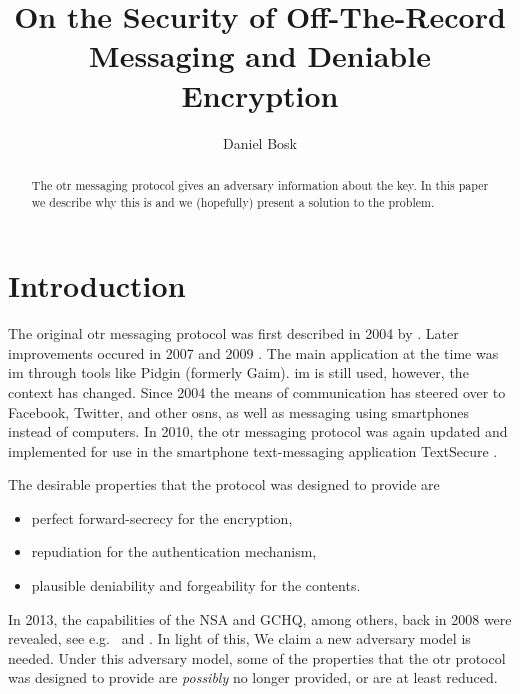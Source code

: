 \title{%
  On the Security of Off-The-Record Messaging
  and Deniable Encryption
}
\author{%
  Daniel Bosk
}

\maketitle
\begin{abstract}
  The \ac{otr} messaging protocol gives an adversary information about the key.
  In this paper we describe why this is and we (hopefully) present a solution 
  to the problem.
\end{abstract}


\acresetall
\section{Introduction}

The original \ac{otr} messaging protocol was first described in 2004 by 
\citeauthor{otr2004} \cite{otr2004}.
Later improvements occured in 2007 \cite{otr2007} and 2009 \cite{multiotr2009}.
The main application at the time was \ac{im} through tools like Pidgin 
\cite{pidgin} (formerly Gaim).
\ac{im} is still used, however, the context has changed.
Since 2004 the means of communication has steered over to Facebook, Twitter, 
and other \acp{osn}, as well as messaging using smartphones instead of 
computers.
In 2010, the \ac{otr} messaging protocol was again updated and implemented for
use in the smartphone text-messaging application TextSecure \cite{textsecure}.

The desirable properties that the protocol was designed to provide are
\begin{itemize}
  \item perfect forward-secrecy for the encryption,
  \item repudiation for the authentication mechanism,
  \item plausible deniability and forgeability for the contents.
\end{itemize}
In 2013, the capabilities of the NSA and GCHQ, among others, back in 2008 were 
revealed, see e.g.~\cite{nsa1} and \cite{nsa2}.
In light of this, We claim a new adversary model is needed.
Under this adversary model, some of the properties that the \ac{otr} protocol 
was designed to provide are \emph{possibly} no longer provided, or are at least 
reduced.

